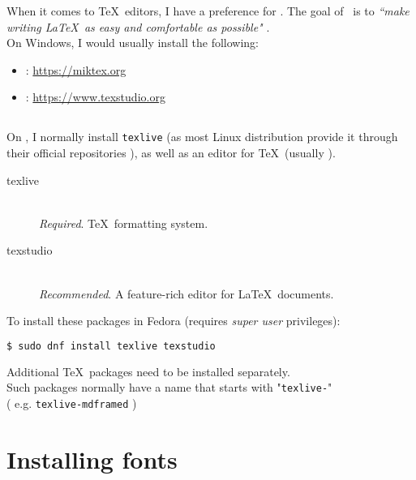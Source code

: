 When it comes to \TeX\ editors, I have a preference for \TeXstudio.
The goal of \TeXstudio\ is to \emph{``make writing \LaTeX\ as easy and comfortable as possible"} \citep{texstudio}. \\

On Windows, I would usually install the following:
\begin{itemize}
	\item \MiKTeX:   \url{https://miktex.org}
	\item \TeXstudio: \url{https://www.texstudio.org} 
\end{itemize}


\subsection*{\Linux}

On \Linux, I normally install \texttt{texlive}  
(as most Linux distribution provide it through their official repositories \citep{texlive}), as well as an editor for \TeX\ (usually \TeXstudio).

\begin{description}
	\item[texlive] \mbox{} \\ 
	\emph{Required}.
	\TeX\ formatting system.
	
	\item[texstudio] \mbox{} \\
	\emph{Recommended}.
	A feature-rich editor for \LaTeX\ documents. \\
\end{description}


To install these packages in Fedora (requires \emph{super user} privileges):
\begin{lstlisting}[language=sh]
$ sudo dnf install texlive texstudio
\end{lstlisting}

\bigskip

Additional \TeX\ packages need to be installed separately. \\

Such packages normally have a name that starts with "\texttt{texlive-}" \\
( e.g. \texttt{texlive-mdframed} )

\bigskip


\section*{Installing fonts}

